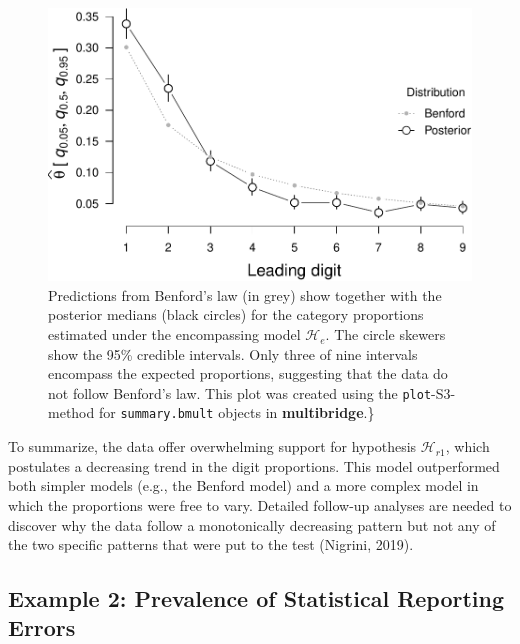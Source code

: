 \documentclass[
  english,
  man,floatsintext]{apa6}
\begin{document}
\begin{figure}
\centering
\includegraphics{Rpackage_paper_files/figure-latex/benford-alt-1.pdf}
\caption{\label{fig:benford-alt}Predictions from Benford's law (in grey) show together with the posterior medians (black circles) for the category proportions estimated under the encompassing model \(\mathcal{H}_e\). The circle skewers show the 95\% credible intervals. Only three of nine intervals encompass the expected proportions, suggesting that the data do not follow Benford's law. This plot was created using the \texttt{plot}-S3-method for \texttt{summary.bmult} objects in \textbf{multibridge}.\}}
\end{figure}

To summarize, the data offer overwhelming support for hypothesis \(\mathcal{H}_{r1}\), which postulates a decreasing trend in the digit proportions. This model outperformed both simpler models (e.g., the Benford model) and a more complex model in which the proportions were free to vary.
Detailed follow-up analyses are needed to discover why the data follow a monotonically decreasing pattern but not any of the two specific patterns that were put to the test (Nigrini, 2019).

\hypertarget{example-2-prevalence-of-statistical-reporting-errors}{%
\subsection{Example 2: Prevalence of Statistical Reporting Errors}\label{example-2-prevalence-of-statistical-reporting-errors}}
\end{document}

